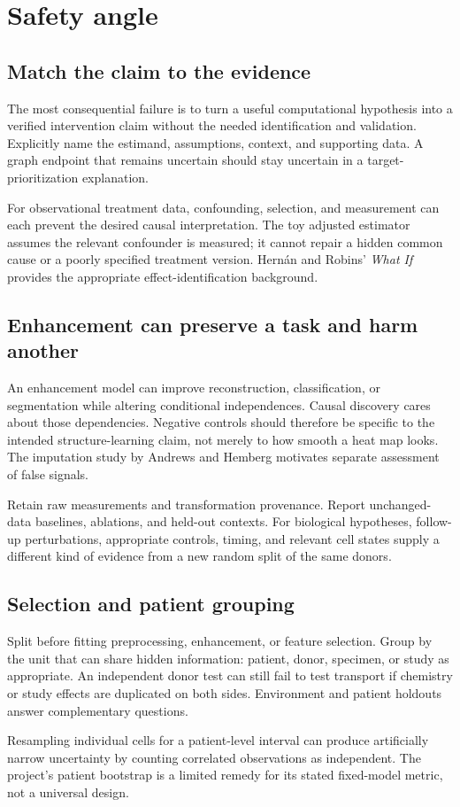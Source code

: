 \documentclass[11pt,oneside]{scrbook}
\begin{document}
\chapter{Safety angle}
\begin{safetyangle}
\section{Match the claim to the evidence}
The most consequential failure is to turn a useful computational hypothesis into a
verified intervention claim without the needed identification and validation. Explicitly
name the estimand, assumptions, context, and supporting data. A graph endpoint that remains
uncertain should stay uncertain in a target-prioritization explanation.

For observational treatment data, confounding, selection, and measurement can each
prevent the desired causal interpretation. The toy adjusted estimator assumes the
relevant confounder is measured; it cannot repair a hidden common cause or a poorly
specified treatment version. Hern\'an and Robins' \emph{What If} provides the appropriate
effect-identification background.

\section{Enhancement can preserve a task and harm another}
An enhancement model can improve reconstruction, classification, or segmentation while
altering conditional independences. Causal discovery cares about those dependencies.
Negative controls should therefore be specific to the intended structure-learning claim,
not merely to how smooth a heat map looks. The imputation study by Andrews and Hemberg
motivates separate assessment of false signals.

Retain raw measurements and transformation provenance. Report unchanged-data baselines,
ablations, and held-out contexts. For biological hypotheses, follow-up perturbations,
appropriate controls, timing, and relevant cell states supply a different kind of evidence
from a new random split of the same donors.

\section{Selection and patient grouping}
Split before fitting preprocessing, enhancement, or feature selection. Group by the unit
that can share hidden information: patient, donor, specimen, or study as appropriate.
An independent donor test can still fail to test transport if chemistry or study effects
are duplicated on both sides. Environment and patient holdouts answer complementary questions.

Resampling individual cells for a patient-level interval can produce artificially narrow
uncertainty by counting correlated observations as independent. The project's patient
bootstrap is a limited remedy for its stated fixed-model metric, not a universal design.
\end{safetyangle}
\end{document}
